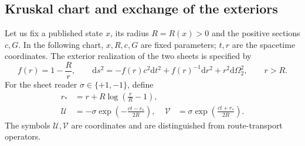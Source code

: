 \subsection{Kruskal chart and exchange of the exteriors}
\label{vii:vii:subsec:kruskal-dos-hojas}

Let us fix a published state \(x\), its radius \(R=R(x)>0\) and the
positive sections \(c,G\). In the following chart, \(x,R,c,G\)
are fixed parameters; \(t,r\) are the spacetime coordinates.
The exterior realization of the two sheets is specified by
\begin{equation}
 f(r)=1-\frac Rr,\qquad
 \mathrm ds^2=-f(r)c^2\mathrm dt^2+f(r)^{-1}\mathrm dr^2
                 +r^2\mathrm d\Omega_2^2,\qquad r>R.
 \label{vii:vii:eq:metrica-exterior}
\end{equation}
For the sheet reader \(\sigma\in\{+1,-1\}\), define
\begin{align}
 r_*&=r+R\log\left(\frac rR-1\right),\\
 \mathcal U&=-\sigma\exp\left(-\frac{ct-r_*}{2R}\right),&
 \mathcal V&=\sigma\exp\left(\frac{ct+r_*}{2R}\right).
 \label{vii:vii:eq:carta-kruskal}
\end{align}
The symbols \(\mathcal U,\mathcal V\) are coordinates and are
distinguished from route-transport operators.

